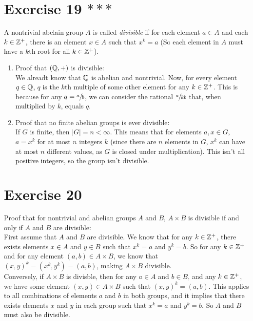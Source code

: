 \documentclass[12pt]{article}
\begin{document}
    
    \section*{Exercise 19 $***$}
    A nontrivial abelain group $A$ is called \textit{divisible}
    if for each element $a \in A$ and each $k \in \mathbb{Z}^+$,
    there is an element $x \in A$ such that $x^k = a$
    (So each element in $A$ must have a $k$th root for all $k \in \mathbb{Z}^+$).
    \begin{enumerate}[label=\textbf{\alph*.}]
        \item
            Proof that $(\mathbb{Q}, +)$ is divisible: \\
            We alreadt know that $\mathbb{Q}$ is abelian and nontrivial.
            Now, for every element $q \in \mathbb{Q}$,
            $q$ is the $k$th multiple of some other element 
            for any $k \in \mathbb{Z}^+$.
            This is because for any $q = \sfrac{a}{b}$,
            we can consider the rational $\sfrac{a}{kb}$
            that, when multiplied by $k$,
            equals $q$.
        \item
            Proof that no finite abelian groups is ever divisible: \\
            If $G$ is finite,
            then $|G| = n < \infty$.
            This means that for elements $a, x \in G$,
            $a = x^k$ for at most $n$ integers $k$
            (since there are $n$ elements in $G$,
            $x^k$ can have at most $n$ different values,
            as $G$ is closed under multiplication).
            This isn't all positive integers,
            so the group isn't divisible.
    \end{enumerate}


    \section*{Exercise 20}
    Proof that for nontrivial and abelian groups $A$ and $B$,
    $A \times B$ is divisible if and only if $A$ and $B$ are divisible: \\
    First assume that $A$ and $B$ are divisible.
    We know that for any $k \in \mathbb{Z}^+$,
    there exists elements $x \in A$ and $y \in B$
    such that $x^k = a$ and $y^k = b$.
    So for any $k \in \mathbb{Z}^+$ and for any element $(a, b) \in A \times B$,
    we know that $(x, y)^k = (x^k, y^k) = (a, b)$,
    making $A \times B$ divisible. \\
    Conversely, if $A \times B$ is divisble,
    then for any $a \in A$ and $b \in B$,
    and any $k \in \mathbb{Z}^+$,
    we have some element $(x, y) \in A \times B$
    such that $(x, y)^k = (a, b)$.
    This applies to all combinations of elements $a$ and $b$
    in both groups,
    and it implies that there exists elements $x$ and $y$
    in each group such that $x^k = a$ and $y^k = b$.
    So $A$ and $B$ must also be divisible.

    
\end{document}
